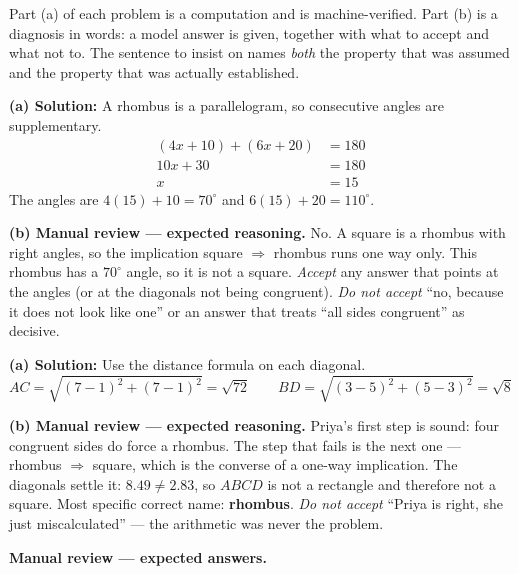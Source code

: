 \documentclass[12pt]{article}
\begin{document}


\noindent\small Part (a) of each problem is a computation and is machine-verified. Part (b) is a
diagnosis in words: a model answer is given, together with what to accept and what not to. The
sentence to insist on names \emph{both} the property that was assumed and the property that was
actually established.\normalsize

\textbf{(a) Solution:} A rhombus is a parallelogram, so consecutive angles are supplementary.
\begin{align*}
(4x + 10) + (6x + 20) &= 180 \\
10x + 30 &= 180 \\
x &= 15
\end{align*}
The angles are $4(15) + 10 = 70^\circ$ and $6(15) + 20 = 110^\circ$.

\textbf{(b) Manual review --- expected reasoning.} No. A square is a rhombus with right angles, so
the implication square $\Rightarrow$ rhombus runs one way only. This rhombus has a $70^\circ$
angle, so it is not a square. \emph{Accept} any answer that points at the angles (or at the
diagonals not being congruent). \emph{Do not accept} ``no, because it does not look like one'' or
an answer that treats ``all sides congruent'' as decisive.

\textbf{(a) Solution:} Use the distance formula on each diagonal.
\[ AC = \sqrt{(7-1)^2 + (7-1)^2} = \sqrt{72} \qquad
   BD = \sqrt{(3-5)^2 + (5-3)^2} = \sqrt{8} \]
 \qquad {}

\textbf{(b) Manual review --- expected reasoning.} Priya's first step is sound: four congruent
sides do force a rhombus. The step that fails is the next one --- rhombus $\Rightarrow$ square,
which is the converse of a one-way implication. The diagonals settle it: $8.49 \neq 2.83$, so
$ABCD$ is not a rectangle and therefore not a square. Most specific correct name:
\textbf{rhombus}. \emph{Do not accept} ``Priya is right, she just miscalculated'' --- the
arithmetic was never the problem.

\textbf{Manual review --- expected answers.}
\end{document}
